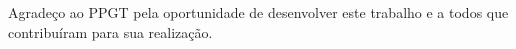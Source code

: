 Agradeço ao PPGT pela oportunidade de desenvolver este trabalho e a todos que contribuíram para sua realização.